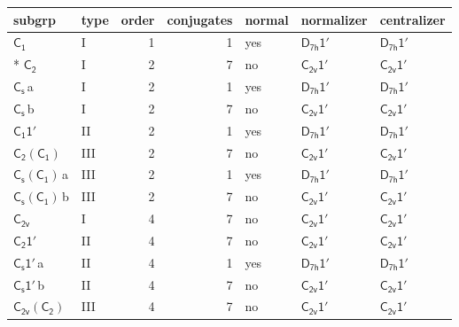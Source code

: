 \documentclass[10pt,a4paper]{article}
\numberwithin{equation}{section}
\newcommand{\grp}[1]{\mathsf{#1}}
\newcommand{\clsletter}[1]{\,{\scriptsize\color{black!55}#1}}
\begin{document}
{\small\begin{longtable}{@{}llrrlll@{}}\toprule
subgrp & type & order & conjugates & normal & normalizer & centralizer\\\midrule\endhead
\bottomrule\endfoot\endlastfoot
\href{../../../rotation/data/pdf/C1.pdf}{$\grp{C_{1}}$} & I & 1 & 1 & yes & \href{D7h-1p.pdf}{$\grp{D_{7h}1'}$} & \href{D7h-1p.pdf}{$\grp{D_{7h}1'}$}\\*
\href{../../../rotation/data/pdf/C2.pdf}{$\grp{C_{2}}$} & I & 2 & 7 & no & \href{C2v-1p.pdf}{$\grp{C_{2v}1'}$} & \href{C2v-1p.pdf}{$\grp{C_{2v}1'}$}\\
\href{../../../rotation/data/pdf/C1v.pdf}{$\grp{C_{s}}$}\clsletter{a} & I & 2 & 1 & yes & \href{D7h-1p.pdf}{$\grp{D_{7h}1'}$} & \href{D7h-1p.pdf}{$\grp{D_{7h}1'}$}\\
\href{../../../rotation/data/pdf/C1v.pdf}{$\grp{C_{s}}$}\clsletter{b} & I & 2 & 7 & no & \href{C2v-1p.pdf}{$\grp{C_{2v}1'}$} & \href{C2v-1p.pdf}{$\grp{C_{2v}1'}$}\\
\href{C1-1p.pdf}{$\grp{C_{1}1'}$} & II & 2 & 1 & yes & \href{D7h-1p.pdf}{$\grp{D_{7h}1'}$} & \href{D7h-1p.pdf}{$\grp{D_{7h}1'}$}\\
\href{C2-C1.pdf}{$\grp{C_{2}}(\grp{C_{1}})$} & III & 2 & 7 & no & \href{C2v-1p.pdf}{$\grp{C_{2v}1'}$} & \href{C2v-1p.pdf}{$\grp{C_{2v}1'}$}\\
\href{C1v-C1.pdf}{$\grp{C_{s}}(\grp{C_{1}})$}\clsletter{a} & III & 2 & 1 & yes & \href{D7h-1p.pdf}{$\grp{D_{7h}1'}$} & \href{D7h-1p.pdf}{$\grp{D_{7h}1'}$}\\
\href{C1v-C1.pdf}{$\grp{C_{s}}(\grp{C_{1}})$}\clsletter{b} & III & 2 & 7 & no & \href{C2v-1p.pdf}{$\grp{C_{2v}1'}$} & \href{C2v-1p.pdf}{$\grp{C_{2v}1'}$}\\
\href{../../../rotation/data/pdf/C2v.pdf}{$\grp{C_{2v}}$} & I & 4 & 7 & no & \href{C2v-1p.pdf}{$\grp{C_{2v}1'}$} & \href{C2v-1p.pdf}{$\grp{C_{2v}1'}$}\\
\href{C2-1p.pdf}{$\grp{C_{2}1'}$} & II & 4 & 7 & no & \href{C2v-1p.pdf}{$\grp{C_{2v}1'}$} & \href{C2v-1p.pdf}{$\grp{C_{2v}1'}$}\\
\href{C1v-1p.pdf}{$\grp{C_{s}1'}$}\clsletter{a} & II & 4 & 1 & yes & \href{D7h-1p.pdf}{$\grp{D_{7h}1'}$} & \href{D7h-1p.pdf}{$\grp{D_{7h}1'}$}\\
\href{C1v-1p.pdf}{$\grp{C_{s}1'}$}\clsletter{b} & II & 4 & 7 & no & \href{C2v-1p.pdf}{$\grp{C_{2v}1'}$} & \href{C2v-1p.pdf}{$\grp{C_{2v}1'}$}\\
\href{C2v-C2.pdf}{$\grp{C_{2v}}(\grp{C_{2}})$} & III & 4 & 7 & no & \href{C2v-1p.pdf}{$\grp{C_{2v}1'}$} & \href{C2v-1p.pdf}{$\grp{C_{2v}1'}$}\\

\end{longtable}}
\end{document}

